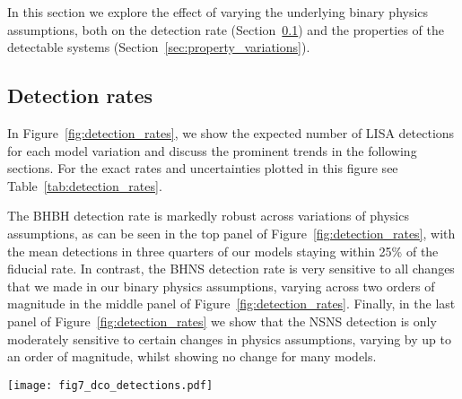 In this section we explore the effect of varying the underlying binary physics assumptions, both on the detection rate (Section~\ref{sec:detection_rate_analysis}) and the properties of the detectable systems (Section~\ref{sec:property_variations}).

\subsection{Detection rates}\label{sec:detection_rate_analysis}
In Figure~\ref{fig:detection_rates}, we show the expected number of LISA detections for each model variation and discuss the prominent trends in the following sections. For the exact rates and uncertainties plotted in this figure see Table~\ref{tab:detection_rates}.

The BHBH detection rate is markedly robust across variations of physics assumptions, as can be seen in the top panel of Figure~\ref{fig:detection_rates}, with the mean detections in three quarters of our models staying within 25\% of the fiducial rate. In contrast, the BHNS detection rate is very sensitive to all changes that we made in our binary physics assumptions, varying across two orders of magnitude in the middle panel of Figure~\ref{fig:detection_rates}. Finally, in the last panel of Figure~\ref{fig:detection_rates} we show that the NSNS detection is only moderately sensitive to certain changes in physics assumptions, varying by up to an order of magnitude, whilst showing no change for many models.

\begin{figure*}[p]
    \centering
    \texttt{[image: fig7\_dco\_detections.pdf]}
    \caption{The number of expected detections in the LISA mission for different DCO types and model variations. Error bars show the 1- (solid) and 2-$\sigma$ (dotted) Poisson uncertainties. An arrow indicates that the error bar extends to zero. The left axis and grid lines show the number of detections in a 4-year LISA mission and the right axis shows an approximation of the number of detections in a 10-year mission (we scale the axis by $\sqrt{T_{\rm obs}}$, see Table~\ref{tab:detection_rates} for exact rates). Each model is described in further detail in Table~\ref{tab:physics_variations} and details of the fiducial assumptions are in Section~\ref{app:fiducial_physics}. See also Fig.~\ref{fig:dco_relative_rates} and Sec.~\ref{sec:detection_rate_analysis} for a discussion. \href{https://github.com/TomWagg/detecting-DCOs-in-LISA/blob/main/paper/figures/fig7_dco_detections.png}{\faFileImage} \href{https://github.com/TomWagg/detecting-DCOs-in-LISA/blob/main/paper/figure_notebooks/variations.ipynb}{\faBook}.}
    \label{fig:detection_rates}
\end{figure*}

